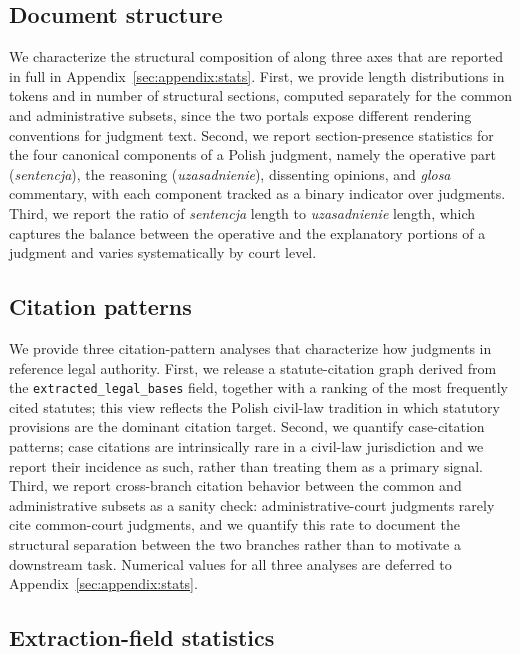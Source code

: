 \subsection{Document structure}
\label{sec:characterization:structure}

We characterize the structural composition of \juddgespl{} along three axes that are reported in full in Appendix~\ref{sec:appendix:stats}. First, we provide length distributions in tokens and in number of structural sections, computed separately for the common and administrative subsets, since the two portals expose different rendering conventions for judgment text. Second, we report section-presence statistics for the four canonical components of a Polish judgment, namely the operative part (\emph{sentencja}), the reasoning (\emph{uzasadnienie}), dissenting opinions, and \emph{glosa} commentary, with each component tracked as a binary indicator over judgments. Third, we report the ratio of \emph{sentencja} length to \emph{uzasadnienie} length, which captures the balance between the operative and the explanatory portions of a judgment and varies systematically by court level.

\subsection{Citation patterns}
\label{sec:characterization:citations}

We provide three citation-pattern analyses that characterize how judgments in \juddgespl{} reference legal authority. First, we release a statute-citation graph derived from the \texttt{extracted\_legal\_bases} field, together with a ranking of the most frequently cited statutes; this view reflects the Polish civil-law tradition in which statutory provisions are the dominant citation target. Second, we quantify case-citation patterns; case citations are intrinsically rare in a civil-law jurisdiction and we report their incidence as such, rather than treating them as a primary signal. Third, we report cross-branch citation behavior between the common and administrative subsets as a sanity check: administrative-court judgments rarely cite common-court judgments, and we quantify this rate to document the structural separation between the two branches rather than to motivate a downstream task. Numerical values for all three analyses are deferred to Appendix~\ref{sec:appendix:stats}.

\subsection{Extraction-field statistics}
\label{sec:characterization:extraction-stats}

